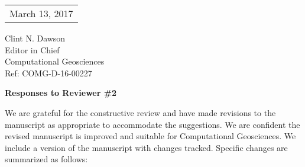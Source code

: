 \documentclass[12pt]{article}\usepackage{amsmath, amssymb, graphicx, array}
\begin{document}
\large

%
%
\large




\begin{tabular}{l}
March 13, 2017
\end{tabular}

\bigskip
\begin{flushleft}
Clint N. Dawson\\
Editor in Chief\\
Computational Geosciences\\
Ref: COMG-D-16-00227
\end{flushleft}


\centerline{\bf Responses to Reviewer \#2}

\bigskip
\bigskip

We are grateful for the constructive review and have made revisions to the manuscript as appropriate to accommodate the suggestions. We are confident the revised manuscript is improved and suitable for Computational Geosciences. We include a version of the manuscript with changes tracked. Specific changes are summarized as follows:
\end{document}
